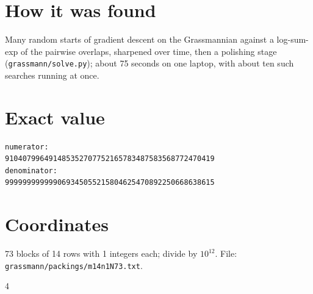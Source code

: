 \documentclass[11pt,a4paper]{article}
\begin{document}
\section{How it was found}
Many random starts of gradient descent on the Grassmannian against a log-sum-exp of the pairwise overlaps, sharpened over time, then a polishing stage (\texttt{grassmann/solve.py}); about 75 seconds on one laptop, with about ten such searches running at once.


\appendix
\section{Exact value}
{\small
\begin{verbatim}
numerator:
910407996491485352707752165783487583568772470419
denominator:
999999999999069345055215804625470892250668638615
\end{verbatim}}

\section{Coordinates}
73 blocks of 14 rows with 1 integers each; divide by $10^{12}$. File: \texttt{grassmann/packings/m14n1N73.txt}.
{\tiny
\begin{multicols}{4}
\end{multicols}}
\end{document}
